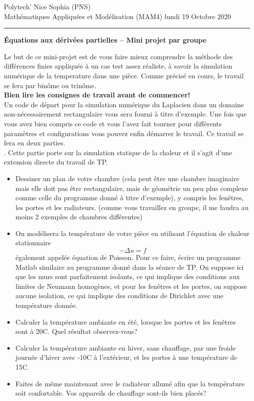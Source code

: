 \documentclass[12pt,a4paper]{article}
\begin{document}
 \hfill Polytech' Nice Sophia (PNS)\\
\noindent Math\'ematiques Appliqu\'ees et Mod\'elisation (MAM4) \hfill lundi 19 Octobre 2020 \\

\hrule

\medskip

\begin{center}{\bf \'Equations aux d\'eriv\'ees partielles -- Mini projet par groupe}\end{center}

\medskip


\noindent Le but de ce mini-projet est de vous faire mieux comprendre la méthode des différences finies appliquée à un cas test assez réaliste, à savoir la simulation numérique de la temperature dans une pièce. Comme précisé en cours, le travail se fera par binôme ou trinôme. \\
{\bf Bien lire les consignes de travail avant de commencer!} \\

\noindent Un code de départ pour la simulation numérique du Laplacien dans un domaine non-nécessairement rectangulaire vous sera fourni à titre d'exemple. Une fois que vous avez bien compris ce code et vous l'avez fait tourner pour différents paramètres et configurations vous pouvez enfin démarrer le travail. Ce travail se fera en deux parties. \\

. Cette partie porte sur la simulation statique de la chaleur et il s'agit d'une extension directe du travail de TP.
\begin{itemize}
\item Dessiner un plan de votre chambre (cela peut être une chambre imaginaire mais elle doit pas être rectangulaire, mais de géométrie un peu plus complexe comme celle du programme donné à titre d'exemple), y compris les fenêtres, les portes et les radiateurs. (comme vous travaillez en groupe, il me faudra au moins 2 exemples de chambres différentes)

\item On modélisera la température de votre pièce en utilisant l'équation de chaleur stationnaire 
$$
-\Delta u = f
$$
également appelée équation de Poisson. Pour ce faire, écrire un programme Matlab similaire au programme donné dans la séance de TP. On suppose ici que les murs sont parfaitement isolants, ce qui implique des conditions aux limites de Neumann homogènes, et pour les fenêtres et les portes, on suppose aucune isolation, ce qui implique des conditions de Dirichlet avec une température donnée.
\item Calculer la température ambiante en été, lorsque les portes et les fenêtres sont à 20C. Quel résultat observez-vous?
\item Calculer la température ambiante en hiver, sans chauffage, par une froide journée d'hiver avec -10C à l'extérieur, et les portes à une température de 15C.
\item Faites de même maintenant avec le radiateur allumé afin que la température soit confortable. Vos appareils de chauffage sont-ils bien placés?
\end{itemize}
\end{document}
